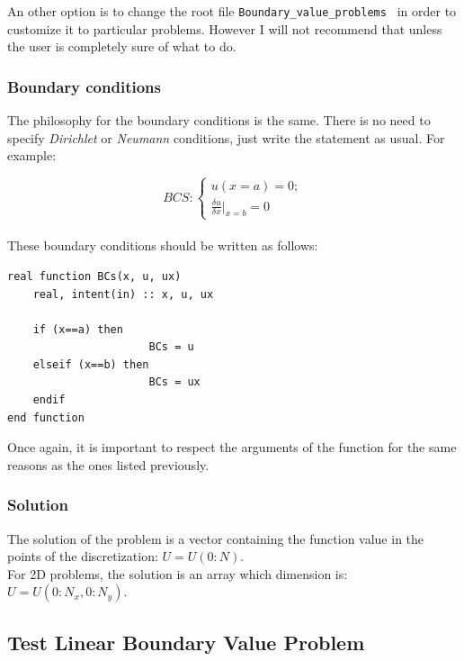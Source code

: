 An other option is to change the root file \texttt{Boundary\_value\_problems }
 in order to customize it to particular problems.
However I will not recommend that unless the user is completely sure of what to
do. \\

\newpage

\subsubsection{Boundary conditions}

The philosophy for the boundary conditions is the same. There is no need to
specify \textit{Dirichlet} or \textit{Neumann} conditions, just write the
statement as usual. For example: 

$$ BCS: \begin{cases} u(x=a)=0;\\ \frac{\delta u}{\delta x}|_{x=b}=0 \end{cases}
$$\\

These boundary conditions should be written as follows: 

\begin{blueframed}
\begin{lstlisting}
real function BCs(x, u, ux) 
	real, intent(in) :: x, u, ux 
           
	if (x==a) then
                      BCs = u 
	elseif (x==b) then
                      BCs = ux 
	endif
end function  
\end{lstlisting}
\end{blueframed}

Once again, it is important to respect the arguments of the function for the
same reasons as the ones listed previously.\\

\subsubsection{Solution}

The solution of the problem is a vector containing the function value in the
points of the discretization: $U=U(0:N)$. \\

For 2D problems, the solution is an array which dimension is: $U=U(0:N_x,
0:N_y)$. \\

\subsection{Test Linear Boundary Value Problem}

